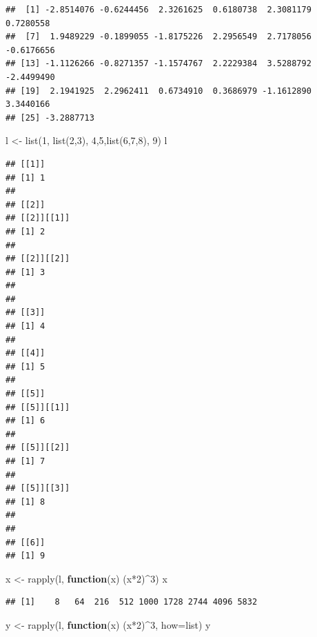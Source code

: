 \documentclass[]{article}
\newenvironment{Shaded}{\begin{snugshade}}{\end{snugshade}}
\newcommand{\AttributeTok}[1]{\textcolor[rgb]{0.77,0.63,0.00}{#1}}
\newcommand{\ControlFlowTok}[1]{\textcolor[rgb]{0.13,0.29,0.53}{\textbf{#1}}}
\newcommand{\DecValTok}[1]{\textcolor[rgb]{0.00,0.00,0.81}{#1}}
\newcommand{\FunctionTok}[1]{\textcolor[rgb]{0.00,0.00,0.00}{#1}}
\newcommand{\NormalTok}[1]{#1}
\newcommand{\OtherTok}[1]{\textcolor[rgb]{0.56,0.35,0.01}{#1}}
\newcommand{\SpecialCharTok}[1]{\textcolor[rgb]{0.00,0.00,0.00}{#1}}
\newcommand{\StringTok}[1]{\textcolor[rgb]{0.31,0.60,0.02}{#1}}
\begin{document}
\begin{verbatim}
##  [1] -2.8514076 -0.6244456  2.3261625  0.6180738  2.3081179  0.7280558
##  [7]  1.9489229 -0.1899055 -1.8175226  2.2956549  2.7178056 -0.6176656
## [13] -1.1126266 -0.8271357 -1.1574767  2.2229384  3.5288792 -2.4499490
## [19]  2.1941925  2.2962411  0.6734910  0.3686979 -1.1612890  3.3440166
## [25] -3.2887713
\end{verbatim}

\begin{Shaded}
\begin{Highlighting}[]
\NormalTok{l }\OtherTok{\textless{}{-}} \FunctionTok{list}\NormalTok{(}\DecValTok{1}\NormalTok{, }\FunctionTok{list}\NormalTok{(}\DecValTok{2}\NormalTok{,}\DecValTok{3}\NormalTok{), }\DecValTok{4}\NormalTok{,}\DecValTok{5}\NormalTok{,}\FunctionTok{list}\NormalTok{(}\DecValTok{6}\NormalTok{,}\DecValTok{7}\NormalTok{,}\DecValTok{8}\NormalTok{), }\DecValTok{9}\NormalTok{)}
\NormalTok{l}
\end{Highlighting}
\end{Shaded}

\begin{verbatim}
## [[1]]
## [1] 1
## 
## [[2]]
## [[2]][[1]]
## [1] 2
## 
## [[2]][[2]]
## [1] 3
## 
## 
## [[3]]
## [1] 4
## 
## [[4]]
## [1] 5
## 
## [[5]]
## [[5]][[1]]
## [1] 6
## 
## [[5]][[2]]
## [1] 7
## 
## [[5]][[3]]
## [1] 8
## 
## 
## [[6]]
## [1] 9
\end{verbatim}

\begin{Shaded}
\begin{Highlighting}[]
\NormalTok{x }\OtherTok{\textless{}{-}} \FunctionTok{rapply}\NormalTok{(l, }\ControlFlowTok{function}\NormalTok{(x) (x}\SpecialCharTok{*}\DecValTok{2}\NormalTok{)}\SpecialCharTok{\^{}}\DecValTok{3}\NormalTok{)}
\NormalTok{x}
\end{Highlighting}
\end{Shaded}

\begin{verbatim}
## [1]    8   64  216  512 1000 1728 2744 4096 5832
\end{verbatim}

\begin{Shaded}
\begin{Highlighting}[]
\NormalTok{y }\OtherTok{\textless{}{-}} \FunctionTok{rapply}\NormalTok{(l, }\ControlFlowTok{function}\NormalTok{(x) (x}\SpecialCharTok{*}\DecValTok{2}\NormalTok{)}\SpecialCharTok{\^{}}\DecValTok{3}\NormalTok{, }\AttributeTok{how=}\StringTok{\textquotesingle{}list\textquotesingle{}}\NormalTok{)}
\NormalTok{y}
\end{Highlighting}
\end{Shaded}
\end{document}
